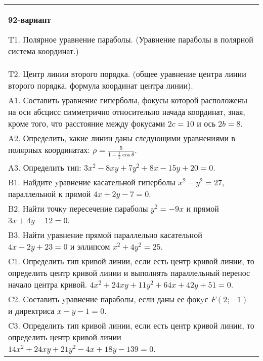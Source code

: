 \documentclass{article}
\begin{document}
\begin{tabular}{m{17cm}}
\textbf{92-вариант}
\newline

T1. Полярное уравнение параболы. (Уравнение параболы в полярной система координат.)\\

T2. Центр линии второго порядка. (общее уравнение центра линии второго порядка, формула координат центра линии).\\

A1. Составить уравнение гиперболы, фокусы которой расположены на оси абсцисс симметрично относительно начада координат, зная, кроме того, что расстояние между фокусами $2c=10$ и ось $2b=8$.\\

A2. Определить, какие линии даны следующими уравнениями в полярных координатах: $\rho=\frac{5}{1-\frac{1}{2}\cos\theta}$.\\

A3. Определить тип: $3x^{2}-8xy+7y^{2}+8x-15y+20=0$.\\

B1. Найдите yравнение касательной гиперболы $x^{2} - y^{2} = 27$, параллельной к прямой $4x + 2y - 7 = 0$.  \\

B2. Найти точкy пересечение параболы $y^{2} = - 9x$ и прямой $3x + 4y - 12 = 0$.  \\

B3. Найти yравнение прямой параллельно касательной $4x - 2y + 23 = 0$ и эллипсом $x^{2} + 4y^{2} = 25$.  \\

C1. Определить тип кривой линии, если есть центр кривой линии, то определить центр кривой линии и выполнять параллельный перенос начало центра кривой. $4x^{2}+24xy+11y^{2}+64x+42y+51=0$.  \\

C2. Cоставить yравнение параболы, если даны ее фокyс $F(2;-1)$ и директриса $x-y-1=0$.  \\

C3. Определить тип кривой линии, если есть центр кривой линии, то определить центр кривой линии $14x^{2}+24xy+21y^{2}-4x+18y-139=0$.  \\

\end{tabular}
\vspace{1cm}
\end{document}
